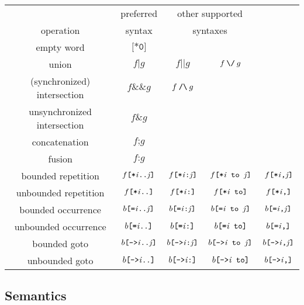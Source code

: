 \documentclass[a4paper,twoside,10pt,DIV=12,draft]{scrreprt}
\newcommand{\OR}{\mathbin{\texttt{|}}}
\newcommand{\ORALT}{\mathbin{\texttt{||}}}
\newcommand{\ORALTT}{\mathbin{\texttt{\char`\\/}}}
\newcommand{\AND}{\mathbin{\texttt{\&}}}
\newcommand{\ANDALT}{\mathbin{\texttt{\&\&}}}
\newcommand{\ANDALTT}{\mathbin{\texttt{/\char`\\}}}
\newcommand{\FUSION}{\mathbin{\texttt{:}}}
\newcommand{\CONCAT}{\mathbin{\texttt{;}}}
\newcommand{\0}{\texttt{0}}
\newcommand{\1}{\texttt{1}}
\newcommand{\STAR}[1]{\texttt{[*#1]}}
\newcommand{\EQUAL}[1]{\texttt{[=#1]}}
\newcommand{\GOTO}[1]{\texttt{[->#1]}}
\newcommand{\eword}{\texttt{[*0]}}
\newcommand\mvar[1]{\ensuremath{\mathit{#1}}}
\begin{document}
\begin{center}
\begin{tabular}{ccccc}
              & preferred & \multicolumn{2}{c}{other supported} \\
   operation  & syntax    & \multicolumn{2}{c}{syntaxes}\\
  \hline
  empty word   & $\eword$ \\
  union        & $f\OR g$  & $f\ORALT g$ & $f\ORALTT g$ \\
  (synchronized) intersection & $f\ANDALT g$ & $f\ANDALTT g$ \\
  unsynchronized intersection & $f\AND g$ \\
  concatenation & $f\CONCAT g$ \\
  fusion & $f\FUSION g$ \\
  bounded repetition & $f\STAR{\mvar{i}..\mvar{j}}$
                     & $f\STAR{\mvar{i}:\mvar{j}}$
                     & $f\STAR{\mvar{i} to \mvar{j}}$
                     & $f\STAR{\mvar{i},\mvar{j}}$\\
  unbounded repetition & $f\STAR{\mvar{i}..}$
                     & $f\STAR{\mvar{i}:}$
                     & $f\STAR{\mvar{i} to}$
                     & $f\STAR{\mvar{i},}$\\
  bounded occurrence & $b\EQUAL{\mvar{i}..\mvar{j}}$
                     & $b\EQUAL{\mvar{i}:\mvar{j}}$
                     & $b\EQUAL{\mvar{i} to \mvar{j}}$
                     & $b\EQUAL{\mvar{i},\mvar{j}}$\\
  unbounded occurrence & $b\EQUAL{\mvar{i}..}$
                     & $b\EQUAL{\mvar{i}:}$
                     & $b\EQUAL{\mvar{i} to}$
                     & $b\EQUAL{\mvar{i},}$\\
  bounded goto       & $b\GOTO{\mvar{i}..\mvar{j}}$
                     & $b\GOTO{\mvar{i}:\mvar{j}}$
                     & $b\GOTO{\mvar{i} to \mvar{j}}$
                     & $b\GOTO{\mvar{i},\mvar{j}}$\\
  unbounded goto     & $b\GOTO{\mvar{i}..}$
                     & $b\GOTO{\mvar{i}:}$
                     & $b\GOTO{\mvar{i} to}$
                     & $b\GOTO{\mvar{i},}$\\
\end{tabular}
\end{center}

\subsection{Semantics}
\end{document}
